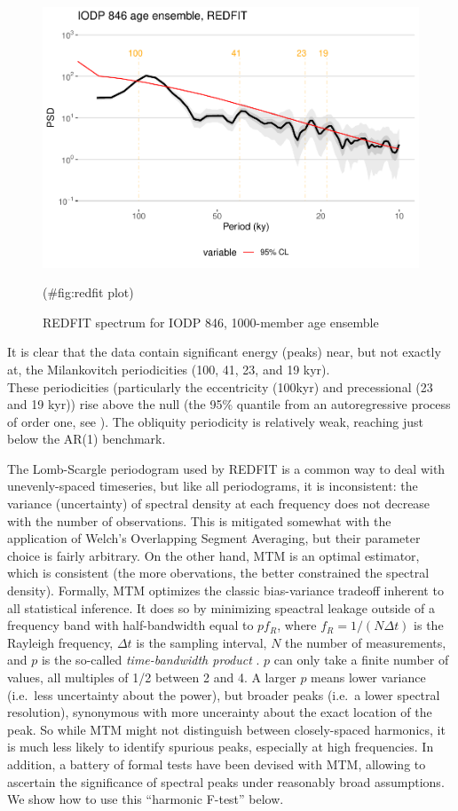 \documentclass[gchron, manuscript]{copernicus}
\begin{document}
\begin{figure}
\includegraphics[width=12cm]{geoChronR-paper_files/figure-latex/redfit plot-1} \caption{REDFIT spectrum for IODP 846, 1000-member age ensemble}(\#fig:redfit plot)
\end{figure}

It is clear that the data contain significant energy (peaks) near, but not exactly at, the Milankovitch periodicities (100, 41, 23, and 19 kyr).\\
These periodicities (particularly the eccentricity (100kyr) and precessional (23 and 19 kyr)) rise above the null (the 95\% quantile from an autoregressive process of order one, see \citet{Mudelsee_NPG09}).
The obliquity periodicity is relatively weak, reaching just below the AR(1) benchmark.

The Lomb-Scargle periodogram used by REDFIT is a common way to deal with unevenly-spaced timeseries, but like all periodograms, it is inconsistent: the variance (uncertainty) of spectral density at each frequency does not decrease with the number of observations. This is mitigated somewhat with the application of Welch's Overlapping Segment Averaging, but their parameter choice is fairly arbitrary.
On the other hand, MTM \citep{thomson82} is an optimal estimator, which is consistent (the more obervations, the better constrained the spectral density).
Formally, MTM optimizes the classic bias-variance tradeoff inherent to all statistical inference.
It does so by minimizing speactral leakage outside of a frequency band with half-bandwidth equal to \(pf_R\), where \(f_R=1/(N \Delta t)\) is the Rayleigh frequency, \(\Delta t\) is the sampling interval, \(N\) the number of measurements, and \(p\) is the so-called \emph{time-bandwidth product} \citep{Ghil02}.
\(p\) can only take a finite number of values, all multiples of 1/2 between 2 and 4.
A larger \(p\) means lower variance (i.e.~less uncertainty about the power), but broader peaks (i.e.~a lower spectral resolution), synonymous with more uncerainty about the exact location of the peak.
So while MTM might not distinguish between closely-spaced harmonics, it is much less likely to identify spurious peaks, especially at high frequencies.
In addition, a battery of formal tests have been devised with MTM, allowing to ascertain the significance of spectral peaks under reasonably broad assumptions. We show how to use this ``harmonic F-test'' below.
\end{document}
